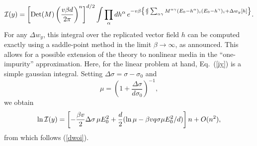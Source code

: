 \begin{equation}
\label{iy}
{\cal{I}}(y)=\left[\mathop{\text{Det}}(M)\left(\frac{v\beta d}{2\pi}\right)^n\right]^{d/2}\int \prod_\alpha dh^\alpha \,
e^{-v\beta\left\{{d\over 2} \sum_{\alpha\gamma}M^{\alpha\gamma}(E_0-h^\alpha)_i (E_0-h^\gamma)_i+\Delta w_y[h]\right\}}.
\end{equation}
For any $\Delta w_y$, this integral over the replicated vector field
$h$ can be computed exactly using a saddle-point method \cite{NEGE87}
in the limit $\beta\to\infty$, as announced. This allows for a
possible extension of the theory to nonlinear media in the
``one-impurity'' approximation. Here, for the linear problem at hand,
Eq.\ (\ref{iy}) is a simple gaussian integral. Setting
$\Delta\sigma=\sigma-\sigma_0$ and
\begin{equation}
\mu=\left(1+\frac{\Delta\sigma}{d\sigma_0}\right)^{-1},
\end{equation}
we obtain
\begin{equation}
\ln{\cal{I}}(y)=\left[-\frac{\beta v}{2}\Delta\sigma\,\mu E_0^2 +\frac{d}{2}(\ln \mu-\beta v q \sigma\mu E_0^2/d)\right]n+O(n^2),
\end{equation}
from which follows (\ref{dwoi}).

